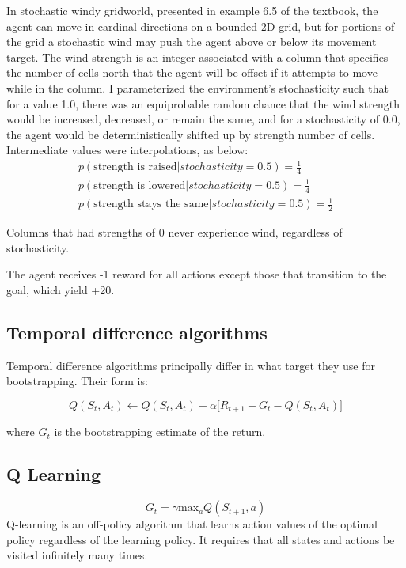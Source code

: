 \documentclass{article}
\begin{document}
	 In stochastic windy gridworld, presented in example 6.5 of the textbook, the agent can move in cardinal directions on a bounded 2D grid, but for portions of the grid a stochastic wind may push the agent above or below its movement target. The wind strength is an integer associated with a column that specifies the number of cells north that the agent will be offset if it attempts to move while in the column. I parameterized the environment's stochasticity such that for a value 1.0, there was an equiprobable random chance that the wind strength would be increased, decreased, or remain the same, and for a stochasticity of 0.0, the agent would be deterministically shifted up by strength number of cells. Intermediate values were interpolations, as below:
     	$$ \begin{aligned}
    p(\text{strength is raised} | stochasticity=0.5) = \frac{1}{4}\\
       p(\text{strength is lowered} | stochasticity=0.5) = \frac{1}{4}\\
      p(\text{strength stays the same} | stochasticity=0.5) = \frac{1}{2}
      \end{aligned}$$

    Columns that had strengths of 0 never experience wind, regardless of stochasticity.

    The agent receives -1 reward for all actions except those that transition to the goal, which yield +20.

	\subsection{Temporal difference algorithms}

	Temporal difference algorithms principally differ in what target they use for bootstrapping. Their form is:

     $$   Q(S_t,A_t) \leftarrow Q(S_t, A_t) + \alpha\big[ R_{t+1} + G_t  - Q(S_t, A_t)\big]$$

     where $G_t$ is the bootstrapping estimate of the return.

 \subsection{Q Learning}
 $$   G_t = \gamma \text{max}_a Q(S_{t+1}, a) $$
	Q-learning is an off-policy algorithm that learns action values of the optimal policy regardless of the learning policy. It requires that all states and actions be visited infinitely many times.
\end{document}
